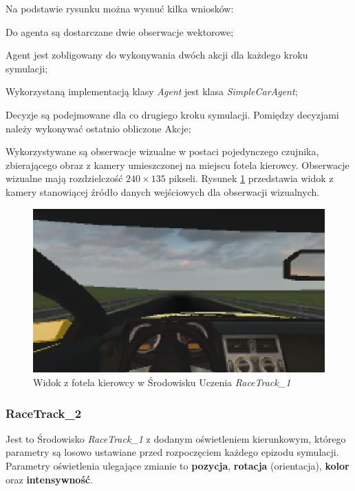 \noindent
Na podstawie rysunku można wysnuć kilka wniosków:
\vspace{-0.5cm}
\begin{itemize*}
\item Do agenta są dostarczane dwie obserwacje wektorowe;
\item Agent jest zobligowany do wykonywania dwóch akcji dla każdego kroku symulacji;
\item Wykorzystaną implementacją klasy \textit{Agent} jest klasa \textit{SimpleCarAgent};
\item Decyzje są podejmowane dla co drugiego kroku symulacji. Pomiędzy decyzjami należy wykonywać ostatnio obliczone Akcje;
\item Wykorzystywane są obserwacje wizualne w postaci pojedynczego czujnika, zbierającego obraz z kamery umieszczonej na miejscu fotela kierowcy. Obserwacje wizualne mają rozdzielczość $240 \times 135$ pikseli. Rysunek \ref{RaceTrack1Cockpit} przedstawia widok z kamery stanowiącej źródło danych wejściowych dla obserwacji wizualnych.
\end{itemize*}

\begin{figure}[h]
\begin{center}
\includegraphics[width=15cm]{resources/figures/race_track_1_cockpit.png}
\caption{Widok z fotela kierowcy w Środowisku Uczenia \textit{RaceTrack\_1}}
\label{RaceTrack1Cockpit}
\end{center}
\end{figure}

\subsubsection{RaceTrack\_2}
Jest to Środowisko \textit{RaceTrack\_1} z dodanym oświetleniem kierunkowym, którego parametry są losowo ustawiane przed rozpoczęciem każdego epizodu symulacji. Parametry oświetlenia ulegające zmianie to \textbf{pozycja}, \textbf{rotacja} (orientacja), \textbf{kolor} oraz \textbf{intensywność}.

